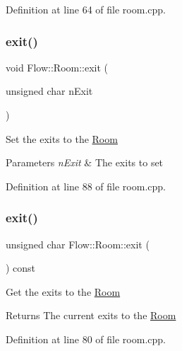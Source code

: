Definition at line 64 of file room.\+cpp.

\hypertarget{class_flow_1_1_room_a67dabfa09fc6c04cf9706c6387083990}{}\label{class_flow_1_1_room_a67dabfa09fc6c04cf9706c6387083990} 
\subsubsection{\texorpdfstring{exit()}{exit()}\hspace{0.1cm}{\footnotesize\ttfamily [1/2]}}
{\footnotesize\ttfamily void Flow\+::\+Room\+::exit (\begin{DoxyParamCaption}\item[{unsigned char}]{n\+Exit }\end{DoxyParamCaption})}

Set the exits to the \hyperlink{class_flow_1_1_room}{Room} 
\begin{DoxyParams}{Parameters}
{\em n\+Exit} & The exits to set \\
\hline
\end{DoxyParams}


Definition at line 88 of file room.\+cpp.

\hypertarget{class_flow_1_1_room_afddbff9ee70421d5df3dbbf202afe35f}{}\label{class_flow_1_1_room_afddbff9ee70421d5df3dbbf202afe35f} 
\subsubsection{\texorpdfstring{exit()}{exit()}\hspace{0.1cm}{\footnotesize\ttfamily [2/2]}}
{\footnotesize\ttfamily unsigned char Flow\+::\+Room\+::exit (\begin{DoxyParamCaption}{ }\end{DoxyParamCaption}) const}

Get the exits to the \hyperlink{class_flow_1_1_room}{Room} \begin{DoxyReturn}{Returns}
The current exits to the \hyperlink{class_flow_1_1_room}{Room} 
\end{DoxyReturn}


Definition at line 80 of file room.\+cpp.

\hypertarget{class_flow_1_1_room_a2a41303b2f9856fd8d9f7fcf7feccab5}{}\label{class_flow_1_1_room_a2a41303b2f9856fd8d9f7fcf7feccab5} 
